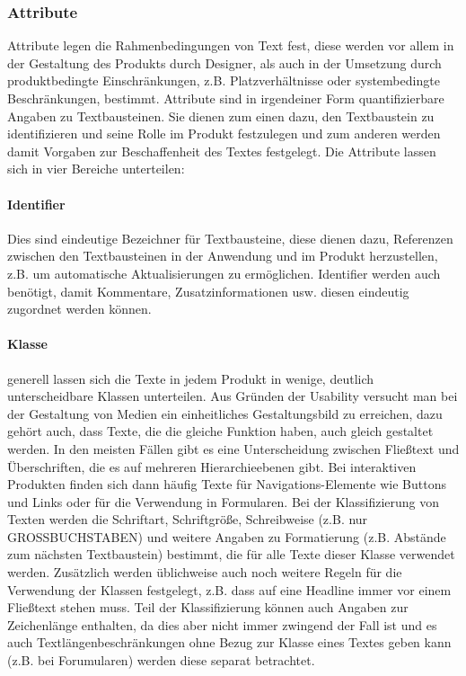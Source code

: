 
\subsubsection{Attribute} 

Attribute legen die Rahmenbedingungen von Text fest, diese werden vor allem in der Gestaltung des Produkts durch Designer, als auch in der Umsetzung durch produktbedingte Einschränkungen, z.B. Platzverhältnisse oder systembedingte Beschränkungen, bestimmt. Attribute sind in irgendeiner Form quantifizierbare Angaben zu Textbausteinen. Sie dienen zum einen dazu, den Textbaustein zu identifizieren und seine Rolle im Produkt festzulegen und zum anderen werden damit Vorgaben zur Beschaffenheit des Textes festgelegt. Die Attribute lassen sich in vier Bereiche unterteilen:

\paragraph{Identifier} Dies sind eindeutige Bezeichner für Textbausteine, diese dienen dazu, Referenzen zwischen den Textbausteinen in der Anwendung und im Produkt herzustellen, z.B. um automatische Aktualisierungen zu ermöglichen. Identifier werden auch benötigt, damit Kommentare, Zusatzinformationen usw. diesen eindeutig zugordnet werden können.

\paragraph{Klasse} generell lassen sich die Texte in jedem Produkt in wenige, deutlich unterscheidbare Klassen unterteilen. Aus Gründen der Usability versucht man bei der Gestaltung von Medien ein einheitliches Gestaltungsbild zu erreichen, dazu gehört auch, dass Texte, die die gleiche Funktion haben, auch gleich gestaltet werden. In den meisten Fällen gibt es eine Unterscheidung zwischen Fließtext und Überschriften, die es auf mehreren Hierarchieebenen gibt. Bei interaktiven Produkten finden sich dann häufig Texte für Navigations-Elemente wie Buttons und Links oder für die Verwendung in Formularen. Bei der Klassifizierung von Texten werden die Schriftart, Schriftgröße, Schreibweise  (z.B. nur GROSSBUCHSTABEN) und weitere Angaben zu Formatierung (z.B. Abstände zum nächsten Textbaustein) bestimmt, die für alle Texte dieser Klasse verwendet werden. Zusätzlich werden üblichweise auch noch weitere Regeln für die Verwendung der Klassen festgelegt, z.B. dass auf eine Headline immer vor einem Fließtext stehen muss. Teil der Klassifizierung können auch Angaben zur Zeichenlänge enthalten, da dies aber nicht immer zwingend der Fall ist und es auch Textlängenbeschränkungen ohne Bezug zur Klasse eines Textes geben kann (z.B. bei Forumularen) werden diese separat betrachtet.

